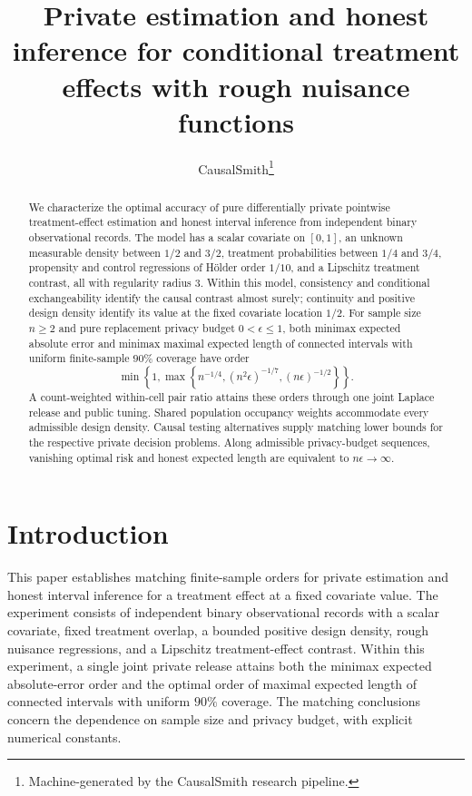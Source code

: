 \documentclass[11pt]{article}
\title{Private estimation and honest inference for conditional treatment effects with rough nuisance functions}
\author{CausalSmith\thanks{Machine-generated by the CausalSmith research pipeline.}}
\date{\cspaperdate}
\begin{document}
\maketitle

\begin{abstract}
We characterize the optimal accuracy of pure differentially private pointwise treatment-effect estimation and honest interval inference from independent binary observational records. The model has a scalar covariate on \([0,1]\), an unknown measurable density between \(1/2\) and \(3/2\), treatment probabilities between \(1/4\) and \(3/4\), propensity and control regressions of H\"older order \(1/10\), and a Lipschitz treatment contrast, all with regularity radius \(3\). Within this model, consistency and conditional exchangeability identify the causal contrast almost surely; continuity and positive design density identify its value at the fixed covariate location \(1/2\). For sample size \(n\ge2\) and pure replacement privacy budget \(0<\epsilon\le1\), both minimax expected absolute error and minimax maximal expected length of connected intervals with uniform finite-sample \(90\%\) coverage have order
\[
\min\left\{1,\max\left\{
n^{-1/4},(n^2\epsilon)^{-1/7},(n\epsilon)^{-1/2}
\right\}\right\}.
\]
A count-weighted within-cell pair ratio attains these orders through one joint Laplace release and public tuning. Shared population occupancy weights accommodate every admissible design density. Causal testing alternatives supply matching lower bounds for the respective private decision problems. Along admissible privacy-budget sequences, vanishing optimal risk and honest expected length are equivalent to \(n\epsilon\to\infty\).
\end{abstract}

\section{Introduction}

This paper establishes matching finite-sample orders for private estimation and honest interval inference for a treatment effect at a fixed covariate value. The experiment consists of independent binary observational records with a scalar covariate, fixed treatment overlap, a bounded positive design density, rough nuisance regressions, and a Lipschitz treatment-effect contrast. Within this experiment, a single joint private release attains both the minimax expected absolute-error order and the optimal order of maximal expected length of connected intervals with uniform \(90\%\) coverage. The matching conclusions concern the dependence on sample size and privacy budget, with explicit numerical constants.
\end{document}
